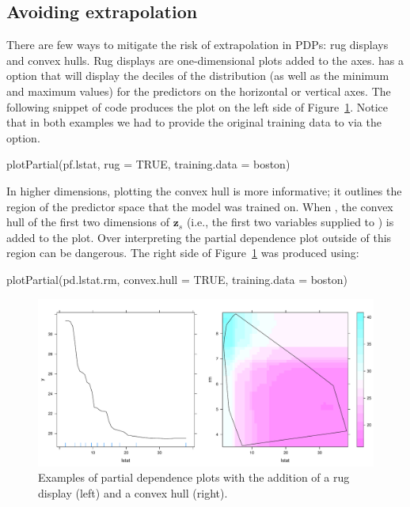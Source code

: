 \subsection{Avoiding extrapolation}

There are few ways to mitigate the risk of extrapolation in PDPs: rug displays and convex hulls. Rug displays are one-dimensional plots added to the axes.  has a  option that will display the deciles of the distribution (as well as the minimum and maximum values) for the predictors on the horizontal or vertical axes. The following snippet of code produces the plot on the left side of Figure~\ref{fig:partial_extrap}. Notice that in both examples we had to provide the original training data to  via the  option.
\begin{example}
plotPartial(pf.lstat, rug = TRUE, training.data = boston)
\end{example}

In higher dimensions, plotting the convex hull is more informative; it outlines the region of the predictor space that the model was trained on. When , the convex hull of the first two dimensions of $\boldsymbol{z}_s$ (i.e., the first two variables supplied to ) is added to the plot. Over interpreting the partial dependence plot outside of this region can be dangerous. The right side of Figure~\ref{fig:partial_extrap} was produced using:
\begin{example}
plotPartial(pd.lstat.rm, convex.hull = TRUE, training.data = boston)
\end{example}

\begin{figure}[htbp]
  \centering
  \includegraphics[width=1.0\linewidth]{partial_extrap}
  \caption{Examples of partial dependence plots with the addition of a rug display (left) and a convex hull (right).}
  \label{fig:partial_extrap}
\end{figure}

